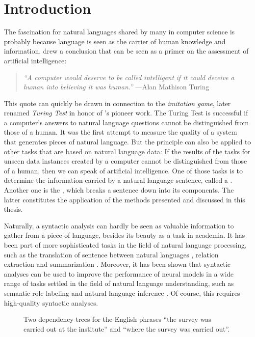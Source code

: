 \documentclass[../document.tex]{subfiles}
\begin{document}
    \chapter{Introduction}
    The fascination for natural languages shared by many in computer science is probably because language is seen as the carrier of human knowledge and information.
     drew a conclusion that can be seen as a primer on the assessment of artificial intelligence:
    \begin{quote}
        \emph{``A computer would deserve to be called intelligent if it could deceive a human into believing it was human.''} \hfill ---Alan Mathison Turing
    \end{quote}
    This quote can quickly be drawn in connection to the \emph{imitation game}, later renamed \emph{Turing Test} in honor of \citeauthor{Turing2009}'s pioneer work.
    The Turing Test is successful if a computer's answers to natural language questions cannot be distinguished from those of a human.
    It was the first attempt to measure the quality of a system that generates pieces of natural language.
    But the principle can also be applied to other tasks that are based on natural language data:
        If the results of the tasks for unseen data instances created by a computer cannot be distinguished from those of a human, then we can speak of artificial intelligence.
    One of those tasks is to determine the information carried by a natural language sentence, called a .
    Another one is the , which breaks a sentence down into its components.
    The latter constitutes the application of the methods presented and discussed in this thesis.

    Naturally, a syntactic analysis can hardly be seen as valuable information to gather from a piece of language, besides its beauty as a task in academia.
    It has been part of more sophisticated tasks in the field of natural language processing, such as the translation of sentence between natural languages \citep{Zhang19,Yang22}, relation extraction \citep{Ngu19} and summarization \citep{Bal21}.
    Moreover, it has been shown that syntactic analyses can be used to improve the performance of neural models in a wide range of tasks settled in the field of natural language understanding, such as semantic role labeling and natural language inference \citep{Liu19, Wang19, Fei20}.
    Of course, this requires high-quality syntactic analyses.

    \begin{figure}
        \null\hfill
        
        \hfill
        
        \hfill\null
        \caption{\label{fig:dependency}
            Two dependency trees for the English phrases ``the survey was carried out at the institute'' and ``where the survey was carried out''.
        }
    \end{figure}
\end{document}

